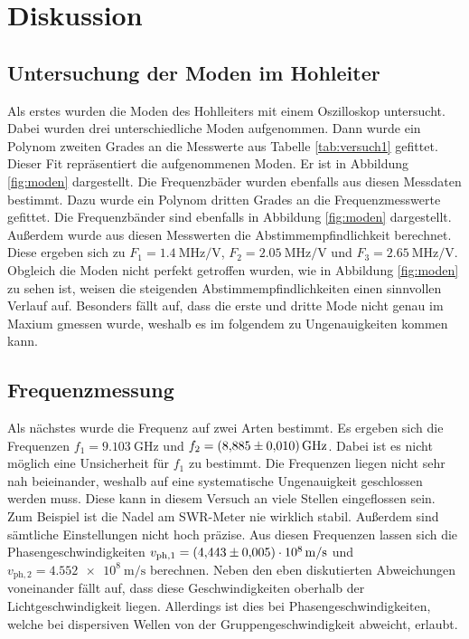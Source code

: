 \chapter{Diskussion}
\label{cha:Diskussion}
\section{Untersuchung der Moden im Hohleiter}
Als erstes wurden die Moden des Hohlleiters mit einem Oszilloskop untersucht. Dabei wurden drei unterschiedliche Moden aufgenommen. Dann wurde ein Polynom zweiten Grades an die 
Messwerte aus Tabelle \ref{tab:versuch1} gefittet. Dieser Fit repräsentiert die aufgenommenen Moden. Er ist in Abbildung \ref{fig:moden} dargestellt. Die Frequenzbäder wurden 
ebenfalls aus diesen Messdaten bestimmt. Dazu wurde ein Polynom dritten Grades an die Frequenzmesswerte gefittet. Die Frequenzbänder sind ebenfalls in Abbildung \ref{fig:moden} 
dargestellt. Außerdem wurde aus diesen Messwerten die Abstimmempfindlichkeit berechnet. Diese ergeben sich zu $F_1 = \qty{1.4}{\mega\hertz\per\volt}$, 
$F_2 = \qty{2.05}{\mega\hertz\per\volt}$ und $F_3 = \qty{2.65}{\mega\hertz\per\volt}$. Obgleich die Moden nicht perfekt getroffen wurden, wie in Abbildung \ref{fig:moden} zu sehen ist, 
weisen die steigenden Abstimmempfindlichkeiten einen sinnvollen Verlauf auf. Besonders fällt auf, dass die erste und dritte Mode nicht genau im Maxium gmessen wurde, weshalb es im 
folgendem zu Ungenauigkeiten kommen kann.
\section{Frequenzmessung}
Als nächstes wurde die Frequenz auf zwei Arten bestimmt. Es ergeben sich die Frequenzen $f_1 = \qty{9,103}{\giga\hertz}$ und $f_2 = \qty{8,885 +- 0,01}{\giga\hertz}$. Dabei ist es 
nicht möglich eine Unsicherheit für $f_1$ zu bestimmt. Die Frequenzen liegen nicht sehr nah beieinander, weshalb auf eine systematische Ungenauigkeit geschlossen werden muss. Diese 
kann in diesem Versuch an viele Stellen eingeflossen sein. Zum Beispiel ist die Nadel am SWR-Meter nie wirklich stabil. Außerdem sind sämtliche Einstellungen nicht hoch präzise.
Aus diesen Frequenzen lassen sich die Phasengeschwindigkeiten $v_{\mathrm{ph, 1}} = \qty{4,443(0,005)e8}{\metre\per\second}$ und 
$v_{\mathrm{ph, 2}} = \qty{4,552e8}{\metre\per\second}$ berechnen. Neben den eben diskutierten Abweichungen voneinander fällt auf, dass diese Geschwindigkeiten oberhalb der 
Lichtgeschwindigkeit liegen. Allerdings ist dies bei Phasengeschwindigkeiten, welche bei dispersiven Wellen von der Gruppengeschwindigkeit abweicht, erlaubt.
